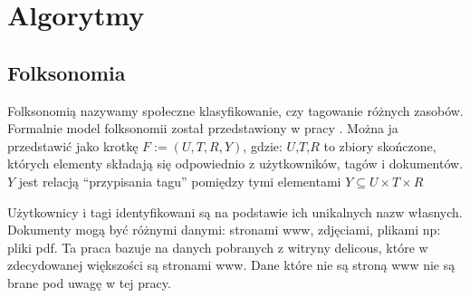 \chapter{Algorytmy}


\section{Folksonomia}

Folksonomią nazywamy społeczne klasyfikowanie, czy tagowanie różnych zasobów. Formalnie model folksonomii został przedstawiony w pracy \cite{hotho2006information}. Można ja przedstawić jako krotkę $F := (U,T,R,Y)$, gdzie:
$U$,$T$,$R$ to zbiory skończone, których elementy składają się odpowiednio z użytkowników, tagów i dokumentów. $Y$ jest relacją “przypisania tagu” pomiędzy tymi elementami $Y \subseteq U \times T \times R$

Użytkownicy i tagi identyfikowani są na podstawie ich unikalnych nazw własnych. Dokumenty mogą być różnymi danymi: stronami www, zdjęciami, plikami np: pliki pdf. Ta praca bazuje na danych pobranych z witryny delicous, które w zdecydowanej większości są stronami www. Dane które nie są stroną www nie są brane pod uwagę w tej pracy. 


